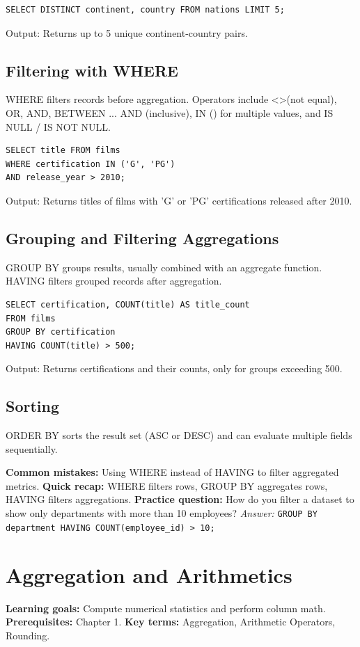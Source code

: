 \documentclass[12pt, a4paper]{article}
\begin{document}
\begin{verbatim}
SELECT DISTINCT continent, country FROM nations LIMIT 5;
\end{verbatim}
Output: Returns up to 5 unique continent-country pairs.

\subsection{Filtering with WHERE}
WHERE filters records before aggregation. Operators include \textless\textgreater (not equal), OR, AND, BETWEEN ... AND (inclusive), IN () for multiple values, and IS NULL / IS NOT NULL.

\begin{verbatim}
SELECT title FROM films 
WHERE certification IN ('G', 'PG') 
AND release_year > 2010;
\end{verbatim}
Output: Returns titles of films with 'G' or 'PG' certifications released after 2010.

\subsection{Grouping and Filtering Aggregations}
GROUP BY groups results, usually combined with an aggregate function. HAVING filters grouped records after aggregation.

\begin{verbatim}
SELECT certification, COUNT(title) AS title_count 
FROM films 
GROUP BY certification 
HAVING COUNT(title) > 500;
\end{verbatim}
Output: Returns certifications and their counts, only for groups exceeding 500.

\subsection{Sorting}
ORDER BY sorts the result set (ASC or DESC) and can evaluate multiple fields sequentially.

\textbf{Common mistakes:} Using WHERE instead of HAVING to filter aggregated metrics.
\textbf{Quick recap:} WHERE filters rows, GROUP BY aggregates rows, HAVING filters aggregations.
\textbf{Practice question:} How do you filter a dataset to show only departments with more than 10 employees?
\textit{Answer:} \texttt{GROUP BY department HAVING COUNT(employee\_id) > 10;}

\section{Aggregation and Arithmetics}
\textbf{Learning goals:} Compute numerical statistics and perform column math.
\textbf{Prerequisites:} Chapter 1.
\textbf{Key terms:} Aggregation, Arithmetic Operators, Rounding.
\end{document}
